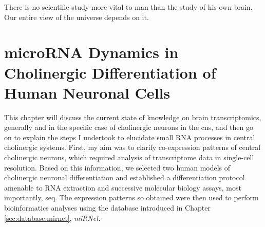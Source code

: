 \begin{savequote}[60mm]
There is no scientific study more vital to man than the study of his own brain. Our entire view of the universe depends on it.
\end{savequote}





\chapter{microRNA Dynamics in Cholinergic Differentiation of Human Neuronal Cells}
 This chapter will discuss the current state of knowledge on brain transcriptomics, generally and in the specific case of cholinergic neurons in the \ac{cns}, and then go on to explain the steps I undertook to elucidate small RNA processes in central cholinergic systems. First, my aim was to clarify co-expression patterns of central cholinergic neurons, which required analysis of transcriptome data in single-cell resolution. Based on this information, we selected two human models of cholinergic neuronal differentiation and established a differentiation protocol amenable to RNA extraction and successive molecular biology assays, most importantly, \ac{seq}. The expression patterns so obtained were then used to perform bioinformatics analyses using the database introduced in Chapter \ref{sec:database:mirnet}, \textit{miRNet}. 









